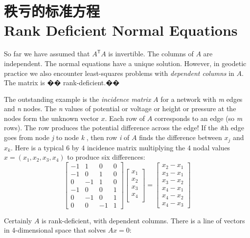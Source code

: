 \section[秩亏的标准方程]{秩亏的标准方程\\Rank Deficient Normal Equations}	
\par \noindent
So far we have assumed that $A^\mathsf{T}A$ is invertible. The columns of $A$ are independent. The normal equations have a unique solution. However, in geodetic practice we also encounter least-squares problems with \emph{dependent columns} in $A$. The matrix is �� rank-deficient.��
\par
The outstanding example is the \emph{incidence matrix} $A$ for a network with \emph{m} edges and \emph{n} nodes. The \emph{n} values of potential or voltage or height or pressure at the nodes form the unknown vector $x$. Each row of $A$ corresponds to an edge (so \emph{m} rows). The row produces the potential difference across the edge! If the \emph{i}th edge goes from node \emph{j}
to node \emph{k} , then row \emph{i} of $A$ finds the difference between $x_j$ and $x_k$.
Here is a typical 6 by 4 incidence matrix multiplying the 4 nodal values $x = (x_1,x_2,x_3,x_4)$ to produce six differences:
\renewcommand\theequation{7.1}
\begin{equation}
	\begin{bmatrix}
		-1 & 1  & 0  & 0\\
		-1 & 0  & 1  & 0\\
		0  & -1 & 1  & 0\\
		-1 & 0  & 0  & 1\\
		0  & -1 & 0  & 1\\
		0  & 0  & -1 & 1
	\end{bmatrix}
	\begin{bmatrix}
		x_1\\
		x_2\\
		x_3\\
		x_4\\
	\end{bmatrix}
	=\begin{bmatrix}
		x_2-x_1\\
		x_3-x_1\\
		x_3-x_2\\
		x_4-x_1\\
		x_4-x_2\\
		x_4-x_3
	\end{bmatrix}
\end{equation}
\par
Certainly $A$ is rank-deficient, with dependent columns. There is a line of vectors in 4-dimensional space that solves $Ax = 0$:
